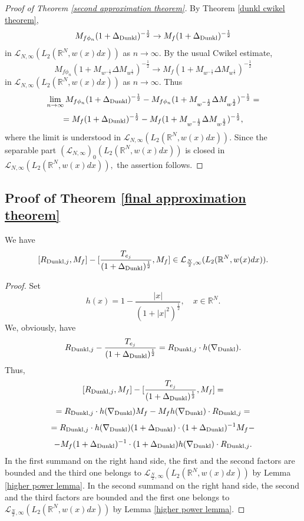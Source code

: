 \documentclass{amsart}
\begin{document}
\begin{proof}[Proof of Theorem \ref{second approximation theorem}]
By Theorem \ref{dunkl cwikel theorem},
$$M_{f\phi_n}(1+\Delta_{{\rm Dunkl}})^{-\frac12}\to M_f(1+\Delta_{{\rm Dunkl}})^{-\frac12}$$
in $\mathcal{L}_{N,\infty}(L_2(\mathbb{R}^N,w(x)dx))$ as $n\to\infty.$ By the usual Cwikel estimate,
$$M_{f\phi_n}(1+M_{w^{-\frac12}}\Delta M_{w^{\frac12}})^{-\frac12}\to M_f(1+M_{w^{-\frac12}}\Delta M_{w^{\frac12}})^{-\frac12}$$
in $\mathcal{L}_{N,\infty}(L_2(\mathbb{R}^N,w(x)dx))$ as $n\to\infty.$ Thus
$$\lim_{n\to\infty}M_{f\phi_n}(1+\Delta_{{\rm Dunkl}})^{-\frac12}-M_{f\phi_n}(1+M_{w^{-\frac12}}\Delta M_{w^{\frac12}})^{-\frac12}=$$
$$=M_f(1+\Delta_{{\rm Dunkl}})^{-\frac12}-M_f(1+M_{w^{-\frac12}}\Delta M_{w^{\frac12}})^{-\frac12},$$
where the limit is understood in $\mathcal{L}_{N,\infty}(L_2(\mathbb{R}^N,w(x)dx)).$ Since the separable part $(\mathcal{L}_{N,\infty})_0(L_2(\mathbb{R}^N,w(x)dx))$ is closed in $\mathcal{L}_{N,\infty}(L_2(\mathbb{R}^N,w(x)dx)),$ the assertion follows.
\end{proof}




\subsection{Proof of Theorem \ref{final approximation theorem}}



\begin{lemma}\label{trivial approximation lemma} We have
$$[R_{{\rm Dunkl},j},M_f]-[\frac{T_{e_j}}{(1+\Delta_{{\rm Dunkl}})^{\frac12}},M_f]\in \mathcal{L}_{\frac{N}{2},\infty}(L_2(\mathbb{R}^N,w(x)dx)).$$
\end{lemma}
\begin{proof} Set
$$h(x)=1-\frac{|x|}{(1+|x|^2)^{\frac12}},\quad x\in\mathbb{R}^N.$$
We, obviously, have
$$R_{{\rm Dunkl},j}-\frac{T_{e_j}}{(1+\Delta_{{\rm Dunkl}})^{\frac12}}=R_{{\rm Dunkl},j}\cdot h(\nabla_{{\rm Dunkl}}).$$
Thus,
$$[R_{{\rm Dunkl},j},M_f]-[\frac{T_{e_j}}{(1+\Delta_{{\rm Dunkl}})^{\frac12}},M_f]=$$
$$=R_{{\rm Dunkl},j}\cdot h(\nabla_{{\rm Dunkl}})M_f-M_fh(\nabla_{{\rm Dunkl}})\cdot R_{{\rm Dunkl},j}=$$
$$=R_{{\rm Dunkl},j}\cdot h(\nabla_{{\rm Dunkl}})(1+\Delta_{{\rm Dunkl}})\cdot (1+\Delta_{{\rm Dunkl}})^{-1} M_f-$$
$$-M_f(1+\Delta_{{\rm Dunkl}})^{-1}\cdot (1+\Delta_{{\rm Dunkl}})h(\nabla_{{\rm Dunkl}})\cdot R_{{\rm Dunkl},j}.$$
In the first summand on the right hand side, the first and the second factors are bounded and the third one belongs to $\mathcal{L}_{\frac{N}{2},\infty}(L_2(\mathbb{R}^N,w(x)dx))$ by Lemma \ref{higher power lemma}. In the second summand on the right hand side, the second and the third factors are bounded and the first one belongs to $\mathcal{L}_{\frac{N}{2},\infty}(L_2(\mathbb{R}^N,w(x)dx))$ by Lemma \ref{higher power lemma}.
\end{proof}
\end{document}
